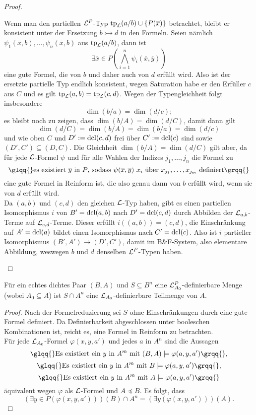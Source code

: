 \begin{proof}
\begin{proof2}
		Wenn man den partiellen $\mathcal{L}^P$-Typ $\operatorname{tp}_{\mathcal{L}}(a/b)\cup\{P(\overline{x})\}$ betrachtet, bleibt er konsistent unter der Ersetzung $b\rightarrowtail d$ in den Formeln. Seien nämlich $\psi_1(\overline{x},b),\dots,\psi_n(\overline{x},b)$ aus $\operatorname{tp}_{\mathcal{L}}(a/b)$, dann ist $$\exists\overline{x}\in P(\bigwedge\limits_{i=1}^n\psi_i(\overline{x},\overline{y}))$$ eine gute Formel, die von $b$ und daher auch von $d$ erfüllt wird. Also ist der ersetzte partielle Typ endlich konsistent, wegen Saturation habe er den Erfüller $c$ aus $C$ und es gilt $\operatorname{tp}_{\mathcal{L}}(a,b)=\operatorname{tp}_{\mathcal{L}}(c,d)$. Wegen der Typengleichheit folgt insbesondere $$\dim(b/a)=\dim(d/c);$$ es bleibt noch zu zeigen, dass $\dim(b/A)=\dim(d/C)$, damit dann gilt $$\dim(d/C)=\dim(b/A)=\dim(b/a)=\dim(d/c)$$ und wie oben $C$ und $D':=\operatorname{dcl}(c,d)$ frei über $C':=\operatorname{dcl}(c)$ sind sowie $(D',C')\subseteq(D,C)$.
		\newpage
		Die Gleichheit $\dim(b/A)=\dim(d/C)$ gilt aber, da für jede $\mathcal{L}$-Formel $\psi$ und für alle Wahlen der Indizes $j_1,\dots,j_n$ die Formel zu $$\glqq{}\text{es existiert }\overline{y}\text{ in }P\text{, sodass }\psi(\overline{x},\overline{y})\ x_i\text{ über }x_{j_1},\dots,x_{j_m}\text{ definiert}\grqq{}$$ eine gute Formel in Reinform ist, die also genau dann von $b$ erfüllt wird, wenn sie von $d$ erfüllt wird.\\
		Da $(a,b)$ und $(c,d)$ den gleichen $\mathcal{L}$-Typ haben, gibt es einen partiellen Isomorphismus $i$ von $B'=\operatorname{dcl}(a,b)$ nach $D'=\operatorname{dcl}(c,d)$ durch Abbilden der $\mathcal{L}_{a,b}$-Terme auf $\mathcal{L}_{c,d}$-Terme. Dieser erfüllt $i((a,b))=(c,d)$, die Einschränkung auf $A'=\operatorname{dcl}(a)$ bildet einen Isomorphismus nach $C'=\operatorname{dcl}(c)$. Also ist $i$ partieller Isomorphismus $(B',A')\rightarrow(D',C')$, damit im B\&F-System, also elementare Abbildung, weswegen $b$ und $d$ denselben $\mathcal{L}^P$-Typen haben.
	\end{proof2}
\end{proof}

\begin{corollary}\label{Definierbarkeit aus A}
	Für ein echtes dichtes Paar $(B,A)$ und $S\subseteq B^n$ eine $\mathcal{L}^P_{A_0}$-definierbare Menge (wobei $A_0\subseteq A$) ist $S\cap A^n$ eine $\mathcal{L}_{A_0}$-definierbare Teilmenge von $A$.
\end{corollary}
\begin{proof}
	Nach der Formelreduzierung sei $S$ ohne Einschränkungen durch eine gute Formel definiert. Da Definierbarkeit abgeschlossen unter booleschen Kombinationen ist, reicht es, eine Formel in Reinform zu betrachten.\\
	Für jede $\mathcal{L}_{A_0}$-Formel $\varphi(x,y,a')$ und jedes $a$ in $A^n$ sind die Aussagen $$\glqq{}\text{Es existiert ein }y\text{ in }A^m\text{ mit }(B,A)\models\varphi(a,y,a')\grqq{},$$ $$\glqq{}\text{Es existiert ein }y\text{ in }A^m\text{ mit }B\models\varphi(a,y,a')\grqq{},$$ $$\glqq{}\text{Es existiert ein }y\text{ in }A^m\text{ mit }A\models\varphi(a,y,a')\grqq{}$$ äquivalent wegen $\varphi$ als $\mathcal{L}$-Formel und $A\preceq B$. Es folgt, dass $$(\exists y\in P(\varphi(x,y,a')))(B)\cap A^n=(\exists y(\varphi(x,y,a')))(A).$$
\end{proof}
\newpage
